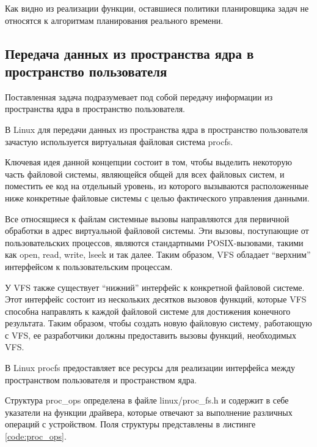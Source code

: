 Как видно из реализации функции, оставшиеся политики планировщика задач не относятся к алгоритмам планирования реального времени.

\subsection{Передача данных из пространства ядра в пространство пользователя}
Поставленная задача подразумевает под собой передачу информации из пространства ядра в пространство пользователя.

В Linux для передачи данных из пространства ядра в пространство пользователя зачастую используется виртуальная файловая система procfs.

Ключевая идея данной концепции состоит в том, чтобы выделить некоторую часть файловой системы, являющейся общей для всех файловых систем, и поместить ее код на отдельный уровень, из которого вызываются расположенные ниже конкретные файловые системы с целью фактического управления данными. \cite{tanenbaum}

Все относящиеся к файлам системные вызовы направляются для первичной обработки в адрес виртуальной файловой системы. Эти вызовы, поступающие от пользовательских процессов, являются стандартными POSIX-вызовами, такими как open, read, write, lseek и так далее. Таким образом, VFS обладает ``верхним'' интерфейсом к пользовательским процессам. \cite{tanenbaum}

У VFS также существует ``нижний'' интерфейс к конкретной файловой системе. Этот интерфейс состоит из нескольких десятков вызовов функций, которые VFS способна направлять к каждой файловой системе для достижения конечного результата. Таким образом, чтобы создать новую файловую систему, работающую с VFS, ее разработчики должны предоставить вызовы функций, необходимых VFS. \cite{tanenbaum}

В Linux procfs предоставляет все ресурсы для реализации интерфейса между пространством пользователя и пространством ядра.

Структура proc\_ops определена в файле linux/proc\_fs.h и содержит в себе указатели на функции драйвера, которые отвечают за выполнение различных операций с устройством. Поля структуры представлены в листинге \ref{code:proc_ops}.


